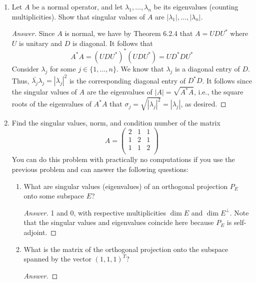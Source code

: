 \documentclass[../psets.tex]{subfiles}
\begin{document}
\begin{enumerate}[label={\textbf{4.\arabic*.}}]
    \item Let $A$ be a normal operator, and let $\lambda_1,\dots,\lambda_n$ be its eigenvalues (counting multiplicities). Show that singular values of $A$ are $|\lambda_1|,\dots,|\lambda_n|$.
    \begin{proof}[Answer]
        Since $A$ is normal, we have by Theorem 6.2.4 that $A=UDU^*$ where $U$ is unitary and $D$ is diagonal. It follows that
        \begin{equation*}
            A^*A = (UDU^*)^*(UDU^*) = UD^*DU^*
        \end{equation*}
        Consider $\lambda_j$ for some $j\in\{1,\dots,n\}$. We know that $\lambda_j$ is a diagonal entry of $D$. Thus, $\bar{\lambda_j}\lambda_j=|\lambda_j|^2$ is the corresponding diagonal entry of $D^*D$. It follows since the singular values of $A$ are the eigenvalues of $|A|=\sqrt{A^*A}$, i.e., the square roots of the eigenvalues of $A^*A$ that $\sigma_j=\sqrt{|\lambda_j|^2}=|\lambda_j|$, as desired.
    \end{proof}
    \item Find the singular values, norm, and condition number of the matrix
    \begin{equation*}
        A =
        \begin{pmatrix}
            2 & 1 & 1\\
            1 & 2 & 1\\
            1 & 1 & 2\\
        \end{pmatrix}
    \end{equation*}
    You can do this problem with practically no computations if you use the previous problem and can answer the following questions:
    \begin{enumerate}
        \item What are singular values (eigenvalues) of an orthogonal projection $P_E$ onto some subspace $E$?
        \begin{proof}[Answer]
            1 and 0, with respective multiplicities $\dim E$ and $\dim E^\perp$. Note that the singular values and eigenvalues coincide here because $P_E$ is self-adjoint.
        \end{proof}
        \item What is the matrix of the orthogonal projection onto the subspace spanned by the vector $(1,1,1)^T$?
        \begin{proof}[Answer]

\end{proof}
\end{enumerate}
\end{enumerate}
\end{document}
